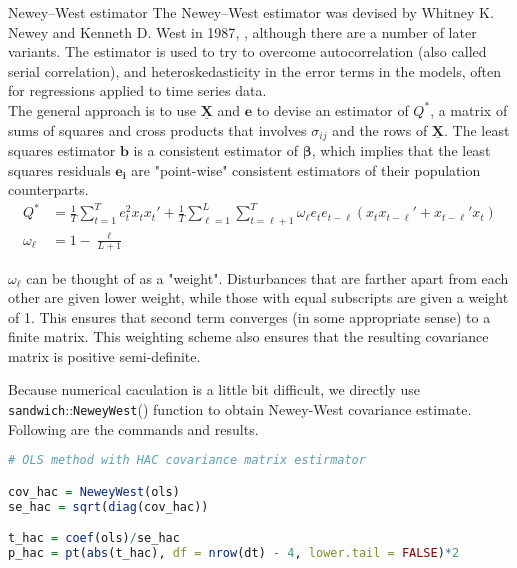 \documentclass{article}
\theoremstyle{definition}
\begin{document}
\begin{itembox}[1]{Newey–West estimator}
The Newey–West estimator was devised by Whitney K. Newey and Kenneth D. West in 1987\cite{NWe}, , although there are a number of later variants. The estimator is used to try to overcome autocorrelation (also called serial correlation), and heteroskedasticity in the error terms in the models, often for regressions applied to time series data.\\
The general approach is to use $\underline{\bm{X}}$ and $\bm{e}$ to devise an estimator of $Q^{*}$,  a matrix of sums of squares and cross products that involves $\sigma_{ij}$ and the rows of $\underline{\bm{X}}$. The least squares estimator $\bm{b}$ is a consistent estimator of $\bm{\beta}$, which implies that the least squares residuals $\bm{e_i}$ are "point-wise" consistent estimators of their population counterparts.\\

\begin{equation*}
	\begin{split}
		Q^{*} & = \frac{1}{T}\sum_{t=1}^{T}e_t^2 x_t x_t ' + \frac{1}{T}\sum_{\ell=1}^{L}\sum_{t=\ell+1}^{T}\omega_{\ell}e_t e_{t-\ell}(x_t x_{t-\ell}' + x_{t-\ell}' x_t )\\
		\omega_{\ell} & = 1 - \frac{\ell}{L+1}
	\end{split}
\end{equation*}

$\omega_{\ell}$ can be thought of as a "weight". Disturbances that are farther apart from each other are given lower weight, while those with equal subscripts are given a weight of 1. This ensures that second term converges (in some appropriate sense) to a finite matrix. This weighting scheme also ensures that the resulting covariance matrix is positive semi-definite.
\end{itembox}

Because numerical caculation is a little bit difficult, we directly use \texttt{sandwich}::\texttt{NeweyWest}() function to obtain Newey-West covariance estimate. Following are the commands and results.\\

\begin{lstlisting}[language=R]
# OLS method with HAC covariance matrix estirmator

cov_hac = NeweyWest(ols)
se_hac = sqrt(diag(cov_hac))

t_hac = coef(ols)/se_hac
p_hac = pt(abs(t_hac), df = nrow(dt) - 4, lower.tail = FALSE)*2
\end{lstlisting}
\end{document}
